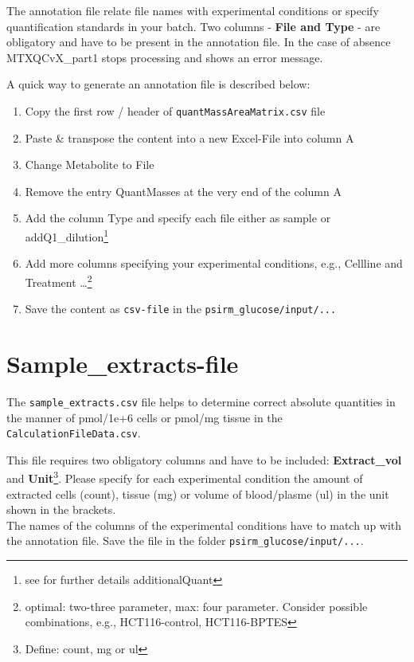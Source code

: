 \documentclass[]{book}
\providecommand{\tightlist}{%
  \setlength{\itemsep}{0pt}\setlength{\parskip}{0pt}}
\let\rmarkdownfootnote\footnote%
\def\footnote{\protect\rmarkdownfootnote}
\theoremstyle{definition}
\theoremstyle{definition}
\theoremstyle{definition}
\theoremstyle{remark}
\begin{document}
The annotation file relate file names with experimental conditions or
specify quantification standards in your batch. Two columns -
\textbf{File and Type} - are obligatory and have to be present in the
annotation file. In the case of absence MTXQCvX\_part1 stops processing
and shows an error message.

A quick way to generate an annotation file is described below:

\begin{enumerate}
\def\labelenumi{\arabic{enumi}.}
\tightlist
\item
  Copy the first row / header of \texttt{quantMassAreaMatrix.csv} file
\item
  Paste \& transpose the content into a new Excel-File into column A
\item
  Change Metabolite to File
\item
  Remove the entry QuantMasses at the very end of the column A
\item
  Add the column Type and specify each file either as sample or
  addQ1\_dilution\footnote{see for further details additionalQuant}
\item
  Add more columns specifying your experimental conditions, e.g.,
  Cellline and Treatment \ldots{}\footnote{optimal: two-three parameter,
    max: four parameter. Consider possible combinations, e.g.,
    HCT116-control, HCT116-BPTES}
\item
  Save the content as \texttt{csv-file} in the
  \texttt{psirm\_glucose/input/...}
\end{enumerate}

\section{Sample\_extracts-file}\label{sample_extracts-file}

The \texttt{sample\_extracts.csv} file helps to determine correct
absolute quantities in the manner of pmol/1e+6 cells or pmol/mg tissue
in the \texttt{CalculationFileData.csv}.

This file requires two obligatory columns and have to be included:
\textbf{Extract\_vol} and \textbf{Unit}\footnote{Define: count, mg or ul}.
Please specify for each experimental condition the amount of extracted
cells (count), tissue (mg) or volume of blood/plasme (ul) in the unit
shown in the brackets.\\
The names of the columns of the experimental conditions have to match up
with the annotation file. Save the file in the folder
\texttt{psirm\_glucose/input/...}.
\end{document}
